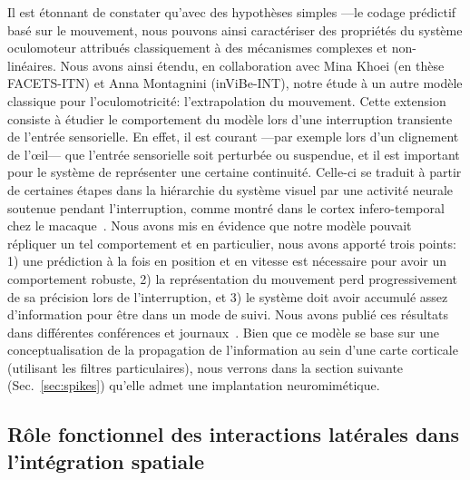 \documentclass[11pt,french,a4paper,oneside]{article}%
\begin{document}
Il est étonnant de constater qu'avec des hypothèses simples ---le codage prédictif basé sur le mouvement, nous pouvons ainsi caractériser des propriétés du système oculomoteur attribués classiquement à des mécanismes complexes et non-linéaires. Nous avons ainsi étendu, en collaboration avec Mina Khoei (en thèse FACETS-ITN) et Anna Montagnini (inViBe-INT), notre étude à un autre modèle classique pour l'oculomotricité: l'extrapolation du mouvement.
Cette extension consiste à étudier le comportement du modèle lors d'une interruption transiente de l'entrée sensorielle. En effet, il est courant ---par exemple lors d'un clignement de l'\oe il--- que l'entrée sensorielle soit perturbée ou suspendue, et il est important pour le système de représenter une certaine continuité. Celle-ci se traduit à partir de certaines étapes dans la hiérarchie du système visuel par une activité neurale soutenue pendant l'interruption, comme montré dans le cortex infero-temporal chez le macaque~\citep{Assad95}. Nous avons mis en évidence que notre modèle pouvait répliquer un tel comportement et en particulier, nous avons apporté trois points: 1) une prédiction à la fois en position et en vitesse est nécessaire pour avoir un comportement robuste, 2) la représentation du mouvement perd progressivement de sa précision lors de l'interruption, et 3) le système doit avoir accumulé assez d'information pour être dans un mode de suivi. Nous avons publié ces résultats dans différentes conférences et journaux~\citep{Khoei13jpp,KhoeiMassonPerrinet17}. Bien que ce modèle se base sur une conceptualisation de la propagation de l'information au sein d'une carte corticale (utilisant les filtres particulaires), nous verrons dans la section suivante (Sec.~\ref{sec:spikes}) qu'elle admet une implantation neuromimétique.

\subsection{Rôle fonctionnel des interactions latérales dans l'intégration spatiale~\citep{PerrinetBednar15}%
}%
\label{sec:PerrinetBednar15}%
\end{document}
